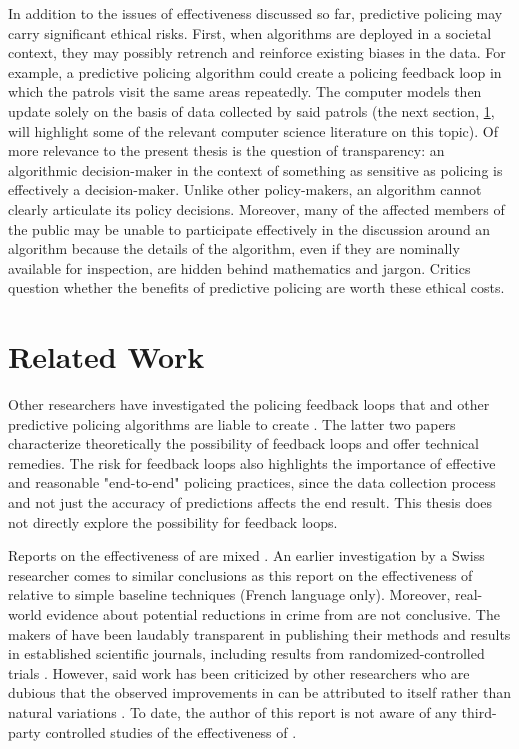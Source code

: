 In addition to the issues of effectiveness discussed so far, predictive policing may carry significant ethical risks. First, when algorithms are deployed in a societal context, they may possibly retrench and reinforce existing biases in the data. For example, a predictive policing algorithm could create a policing feedback loop in which the patrols visit the same areas repeatedly. The computer models then update solely on the basis of data collected by said patrols (the next section, \ref{sec:related_work}, will highlight some of the relevant computer science literature on this topic). Of more relevance to the present thesis is the question of transparency: an algorithmic decision-maker in the context of something as sensitive as policing is effectively a decision-maker. Unlike other policy-makers, an algorithm cannot clearly articulate its policy decisions. Moreover, many of the affected members of the public may be unable to participate effectively in the discussion around an algorithm because the details of the algorithm, even if they are nominally available for inspection, are hidden behind mathematics and jargon. Critics question whether the benefits of predictive policing are worth these ethical costs.

\section{Related Work} \label{sec:related_work}
Other researchers have investigated the policing feedback loops that \pp and other predictive policing algorithms are liable to create \citep{lum_predict_2016,ensign_runaway_2017,ensign_decision_2018}. The latter two papers characterize theoretically the possibility of feedback loops and offer technical remedies. The risk for feedback loops also highlights the importance of effective and reasonable "end-to-end" policing practices, since the data collection process and not just the accuracy of predictions affects the end result. This thesis does not directly explore the possibility for feedback loops.

Reports on the effectiveness of \pp are mixed \citep{robinson_stuck_2016}. An earlier investigation by a Swiss researcher comes to similar conclusions as this report on the effectiveness of \pp relative to simple baseline techniques \citep{benslimane_etude_2014} (French language only). Moreover, real-world evidence about potential reductions in crime from \pp are not conclusive. The makers of \pp have been laudably transparent in publishing their methods and results in established scientific journals, including results from randomized-controlled trials \citep{mohler_self-exciting_2011,mohler_marked_2014,mohler_randomized_2015}. However, said work has been criticized by other researchers who are dubious that the observed improvements in \pp can be attributed to \pp itself rather than natural variations \citep{saunders_predictions_2016}. To date, the author of this report is not aware of any third-party controlled studies of the effectiveness of \pp.

